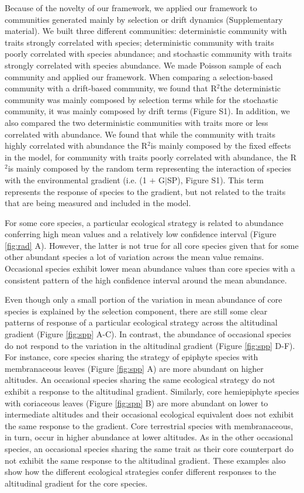 \documentclass[12pt]{article}
\renewcommand{\Rsquared}{R{$^2$}}
\begin{document}
Because of the novelty of our framework, we applied our framework to communities generated mainly by selection or drift dynamics (Supplementary material). We built three different communities: deterministic community with traits strongly correlated with species; deterministic community with traits poorly correlated with species abundance; and stochastic community with traits strongly correlated with species abundance. We made Poisson sample of each community and applied our framework. When comparing a selection-based community with a drift-based community, we found that  \Rsquared the deterministic community was mainly composed by selection terms while for the stochastic community, it was mainly composed by drift terms (Figure S1). In addition, we also compared the two deterministic communities with traits more or less correlated with abundance. We found that while the community with traits highly correlated with abundance the \Rsquared is mainly composed by the fixed effects in the model, for community with traits poorly correlated with abundance, the \Rsquared is mainly composed by the random term representing the interaction of species with the environmental gradient (i.e. (1 $+$ G$|$SP), Figure S1). This term represents the response of species to the gradient, but not related to the traits that are being measured and included in the model.   

For some core species, a particular ecological strategy is related to abundance conferring high mean values and a relatively low confidence interval (Figure \ref{fig:rad} A). However, the latter is not true for all core species given that for some other abundant species a lot of variation across the mean value remains. Occasional species exhibit lower mean abundance values than core species with a consistent pattern of the high confidence interval around the mean abundance. 

Even though only a small portion of the variation in mean abundance of core species is explained by the selection component, there are still some clear patterns of response of a particular ecological strategy across the altitudinal gradient (Figure \ref{fig:spp} A-C). In contrast, the abundance of occasional species do not respond to the variation in the altitudinal gradient (Figure \ref{fig:spp} D-F). For instance, core species sharing the strategy of epiphyte species with membranaceous leaves (Figure \ref{fig:spp} A) are more abundant on higher altitudes. An occasional species sharing the same ecological strategy do not exhibit a response to the altitudinal gradient. Similarly, core hemiepiphyte species with coriaceous leaves (Figure \ref{fig:spp} B) are more abundant on lower to intermediate altitudes and their occasional ecological equivalent does not exhibit the same response to the gradient. Core terrestrial species with membranaceous, in turn, occur in higher abundance at lower altitudes. As in the other occasional species, an occasional species sharing the same trait as their core counterpart do not exhibit the same response to the altitudinal gradient. These examples also show how the different ecological strategies confer different responses to the altitudinal gradient for the core species.
\end{document}
